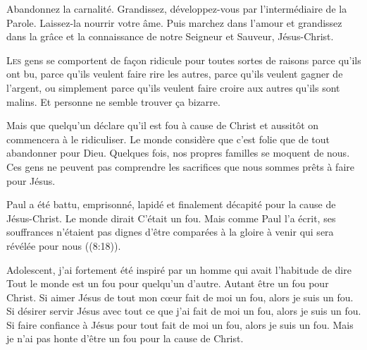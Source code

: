 Abandonnez la carnalité. Grandissez, développez-vous
 par l'intermédiaire de la Parole. Laissez-la nourrir votre âme.
 Puis marchez dans l'amour et grandissez dans la
 grâce et la connaissance de notre Seigneur et Sauveur, Jésus-Christ.

\dvrule






\lettrine{L}{es} gens se comportent de fa\c{c}on ridicule
 pour toutes sortes de raisons \ocadr parce qu'ils ont bu,
 parce qu'ils veulent faire rire les autres,
 parce qu'ils veulent gagner de l'argent,
 ou simplement parce qu'ils veulent faire croire aux autres qu'ils sont malins.
 Et personne ne semble trouver \c{c}a bizarre.

Mais que quelqu'un déclare qu'il est fou à cause de Christ
 et aussitôt on commencera à le ridiculiser.
 Le monde considère que c'est folie que de tout abandonner pour Dieu.
 Quelques fois, nos propres familles se moquent de nous.
 Ces gens ne peuvent pas comprendre les sacrifices
 que nous sommes prêts à faire pour Jésus.

Paul a été battu, emprisonné, lapidé et finalement décapité
 pour la cause de Jésus-Christ. Le monde dirait\frcolon{} 
 \Og C'était un fou. \Fg{}
 Mais comme Paul l'a écrit, ses souffrances n'étaient pas
 \Og dignes d'être comparées à la gloire à venir
 qui sera révélée pour nous \Fg{}\linebreak ((8:18)).


Adolescent, j'ai fortement été inspiré par un homme
 qui avait l'habitude de dire\frcolon{} 
 \Og Tout le monde est un fou pour quelqu'un d'autre.
 Autant être un fou pour Christ. \Fg{}
 Si aimer Jésus de tout mon c\oe{}ur fait de moi un fou,
 alors je suis un fou. Si désirer servir Jésus avec tout ce que j'ai
 fait de moi un fou, alors je suis un fou.
 Si faire confiance à Jésus pour tout fait de moi un fou,
 alors je suis un fou.
 Mais je n'ai pas honte d'être un fou pour la cause de Christ.

